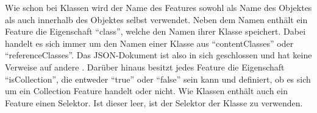     

    Wie schon bei Klassen wird der Name des Features sowohl als Name des Objektes
    als auch innerhalb des Objektes selbst verwendet.
    Neben dem Namen enthält ein Feature die Eigenschaft "`class"',
    welche den Namen ihrer Klasse speichert. Dabei handelt es sich immer
    um den Namen einer Klasse aus "`contentClasses"' oder "`referenceClasses"'.
    Das JSON-Dokument ist also in sich geschlossen und hat keine Verweise auf andere {\resources}.
    Darüber hinaus besitzt jedes Feature die Eigenschaft "`isCollection"',
    die entweder "`true"' oder "`false"' sein kann und definiert,
    ob es sich um ein Collection Feature handelt oder nicht.
    Wie Klassen enthält auch ein Feature einen Selektor.
    Ist dieser leer, ist der Selektor der Klasse zu verwenden.